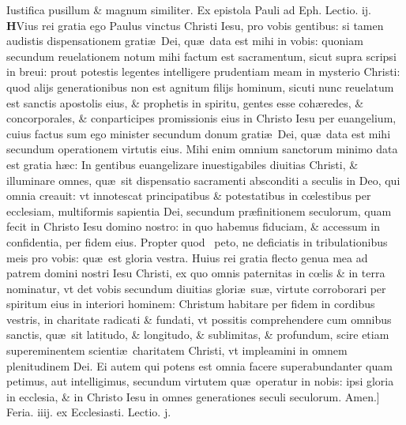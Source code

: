 \documentclass[a5paper,10pt]{book}
\def\leftmarginnote{%
	\lrmarginnote{\hskip -\marginparsep \hskip -6.5em}}
\def\rightmarginnote{%
	\lrmarginnote{\hskip\columnwidth \hskip -1em}}
\def\ae{æ}
\def\oe{œ}
\begin{document}
\begin{multicols*}{2}
Iustifica pusillum \& magnum similiter.
\fancyhead[C]{\color{red} Feria. iij. Dominic\ae . ij. Vagantium}
\newline {} \color{red} Ex epistola Pauli ad Eph. \hfill Lectio. ij. \color{black}
\vspace{-2.25em}
\lettrine[lines=2]{\bfseries \color{red} H}{}Vius\rightmarginnote{ca. 3.} rei gratia ego Paulus vinctus Christi Iesu, pro vobis gentibus: si tamen audistis dispensationem grati\ae \ Dei, qu\ae \ data est mihi in vobis: quoniam secundum reuelationem notum mihi factum est sacramentum, sicut supra scripsi in breui: prout potestis legentes intelligere prudentiam meam in mysterio Christi: quod alijs generationibus non est agnitum filijs hominum, sicuti nunc reuelatum est sanctis apostolis eius, \& prophetis in spiritu, gentes esse coh\ae redes, \& concorporales, \& conparticipes promissionis eius in Christo Iesu per euangelium, cuius factus sum ego minister secundum donum grati\ae \ Dei, qu\ae \ data est mihi secundum operationem virtutis eius.
Mihi enim omnium sanctorum minimo data est gratia h\ae c: In gentibus euangelizare
inuestigabiles diuitias Christi, \& illuminare omnes, qu\ae \ sit dispensatio sacramenti absconditi a seculis in Deo, qui omnia creauit: vt innotescat principatibus \& potestatibus in c\oe lestibus per ecclesiam, multiformis sapientia Dei, secundum pr\ae finitionem seculorum, quam fecit in Christo Iesu domino nostro: in quo habemus fiduciam, \& accessum in confidentia, per fidem eius.
Propter quod \textdagger \ 
peto,\leftmarginnote{\begin{flushright}B\end{flushright}} ne deficiatis in tribulationibus meis pro vobis: qu\ae \ est gloria vestra.
Huius rei gratia flecto genua mea ad patrem domini nostri Iesu Christi, ex quo omnis paternitas in c\oe lis \& in terra nominatur, vt det vobis secundum diuitias glori\ae \ su\ae , virtute corroborari per spiritum eius in interiori hominem: Christum habitare per fidem in cordibus vestris, in charitate radicati \& fundati, vt possitis comprehendere cum omnibus sanctis, qu\ae \ sit latitudo, \& longitudo, \& sublimitas, \& profundum, scire etiam supereminentem scienti\ae \ charitatem Christi, vt impleamini in omnem plenitudinem Dei.
Ei autem qui potens est omnia facere superabundanter quam petimus, aut intelligimus, secundum virtutem qu\ae \ operatur in nobis: ipsi gloria in ecclesia, \& in Christo Iesu in omnes generationes seculi seculorum. Amen.]
\newline \textswab{C} \color{red} \hypertarget{WED-SECVNDA-VAGAN}{Feria. iiij.} ex Ecclesiasti. Lectio. j. \color{black}

\end{multicols*}
\end{document}
